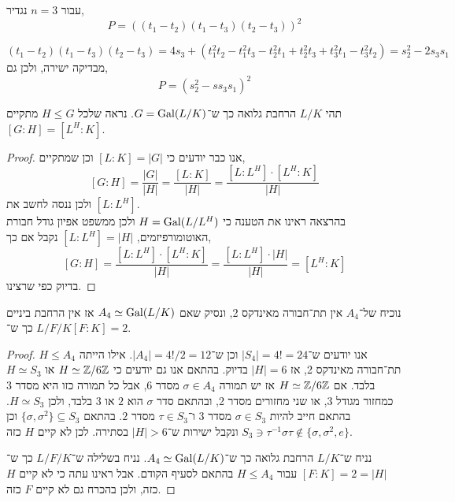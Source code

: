 \subquestion{}
עבור $n = 3$ נגדיר,
\[
	P = {((t_1 - t_2) (t_1 - t_3) (t_2 - t_3))}^2
\]
\begin{solution}
	\[
		(t_1 - t_2) (t_1 - t_3) (t_2 - t_3)
		= 4 s_3 + (t_1^2 t_2 - t_1^2 t_3 - t_2^2 t_1 + t_2^2 t_3 + t_3^2 t_1 - t_3^2 t_2)
		= s_2^2 - 2 s_3 s_1
	\]
	מבדיקה ישירה, ולכן גם,
	\[
		P = {(s_2^2 - s s_3 s_1)}^2
	\]
\end{solution}

\question{}
\subquestion{}
תהי $L / K$ הרחבת גלואה כך ש־$G = \operatorname{Gal}(L / K)$.
נראה שלכל $H \le G$ מתקיים $[G : H] = [L^H : K]$.
\begin{proof}
	אנו כבר יודעים כי $[L : K] = |G|$ וכן שמתקיים,
	\[
		[G : H]
		= \frac{|G|}{|H|}
		= \frac{[L : K]}{|H|}
		= \frac{[L : L^H] \cdot [L^H : K]}{|H|}
	\]
	ולכן ננסה לחשב את $[L : L^H]$. \\
	בהרצאה ראינו את הטענה כי $H = \operatorname{Gal}(L / L^H)$ ולכן ממשפט אפיון גודל חבורת האוטומורפיזמים, $[L : L^H] = |H|$
	נקבל אם כך,
	\[
		[G : H]
		= \frac{[L : L^H] \cdot [L^H : K]}{|H|}
		= \frac{[L : L^H] \cdot |H|}{|H|}
		= [L^H : K]
	\]
	בדיוק כפי שרצינו.
\end{proof}

\subquestion{}
נוכיח של־$A_4$ אין תת־חבורה מאינדקס 2,
ונסיק שאם $A_4 \simeq \operatorname{Gal}(L / K)$ אז אין הרחבת ביניים $L / F / K$ כך ש־$[F : K] = 2$.
\begin{proof}
	אנו יודעים ש־$|S_4| = 4! = 24$ וכן ש־$|A_4| = 4! / 2 = 12$.
	אילו הייתה $H \le A_4$ תת־חבורה מאינדקס 2, אז $|H| = 6$ בדיוק.
	בהתאם אנו גם יודעים כי $H \simeq \mathbb{Z} / 6\mathbb{Z}$ או $H \simeq S_3$ בלבד.
	אם $H \simeq \mathbb{Z} / 6\mathbb{Z}$ אז יש תמורה $\sigma \in A_4$ מסדר $6$,
	אבל כל תמורה כזו היא מסדר 3 כמחזור מגודל 3, או שני מחזורים מסדר 2, ובהתאם סדר $\sigma$ הוא $2$ או $3$ בלבד, ולכן $H \simeq S_3$.
	בהתאם חייב להיות $\sigma \in S_3$ מסדר $3$ ו־$\tau \in S_3$ מסדר $2$.
	בהתאם $\{ \sigma, \sigma^2 \} \subseteq S_3$ וכן $S_3 \ni \tau^{-1} \sigma \tau \notin \{ \sigma, \sigma^2, e \}$ ונקבל ישירות ש־$|H| > 6$ בסתירה.
	לכן לא קיים $H$ כזה.

	נניח ש־$L / K$ הרחבת גלואה כך ש־$A_4 \simeq \operatorname{Gal}(L / K)$.
	נניח בשלילה ש־$L / F / K$ כך ש־$[F : K] = 2 = |H|$ עבור $H \le A_4$ בהתאם לסעיף הקודם.
	אבל ראינו עתה כי לא קיים $H$ כזה, ולכן בהכרח גם לא קיים $F$ כזה.
\end{proof}


